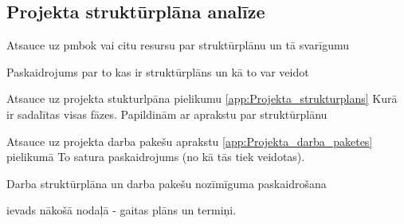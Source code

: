 \subsection{Projekta struktūrplāna analīze}
Atsauce uz pmbok vai citu resursu par struktūrplānu un tā svarīgumu
\par
Paskaidrojums par to kas ir struktūrplāns un kā to var veidot
\par
Atsauce uz projekta stukturlpāna pielikumu \ref{app:Projekta_strukturplans}
Kurā ir sadalītas visas fāzes. Papildinām ar aprakstu par struktūrplānu
\par
Atsauce uz projekta darba pakešu aprakstu \ref{app:Projekta_darba_paketes} pielikumā
To satura paskaidrojums (no kā tās tiek veidotas).
\par
Darba struktūrplāna un darba pakešu nozīmīguma paskaidrošana
\par
ievads nākošā nodaļā - gaitas plāns un termiņi.


